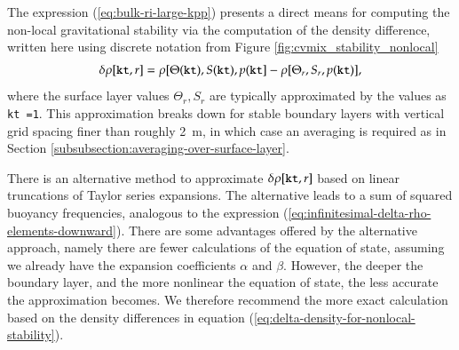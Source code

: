 The expression (\ref{eq:bulk-ri-large-kpp}) presents a direct means
for computing the non-local gravitational stability via the
computation of the density difference, written here using discrete
notation from Figure  \ref{fig:cvmix_stability_nonlocal}
\begin{equation}
 \delta\rho[{\tt kt},r]  = \rho[\Theta({\tt kt}), S({\tt kt}), p({\tt kt} ]  -\rho[\Theta_{r}, S_{r}, p({\tt kt})],
\label{eq:delta-density-for-nonlocal-stability}
\end{equation}
where the surface layer values $\Theta_{r}, S_{r}$ are typically
approximated by the values as {\tt kt =1}.  This approximation breaks
down for stable boundary layers with vertical grid spacing finer than
roughly 2~m, in which case an averaging is required as in Section
\ref{subsubsection:averaging-over-surface-layer}.

There is an alternative method to approximate $\delta\rho[{\tt kt},r]$
based on linear truncations of Taylor series expansions.  The
alternative leads to a sum of squared buoyancy frequencies, analogous
to the expression
(\ref{eq:infinitesimal-delta-rho-elements-downward}).  There are some
advantages offered by the alternative approach, namely there are fewer
calculations of the equation of state, assuming we already have the
expansion coefficients $\alpha$ and $\beta$.  However, the deeper the
boundary layer, and the more nonlinear the equation of state, the less
accurate the approximation becomes.  We therefore recommend the more
exact calculation based on the density differences in equation
(\ref{eq:delta-density-for-nonlocal-stability}).

